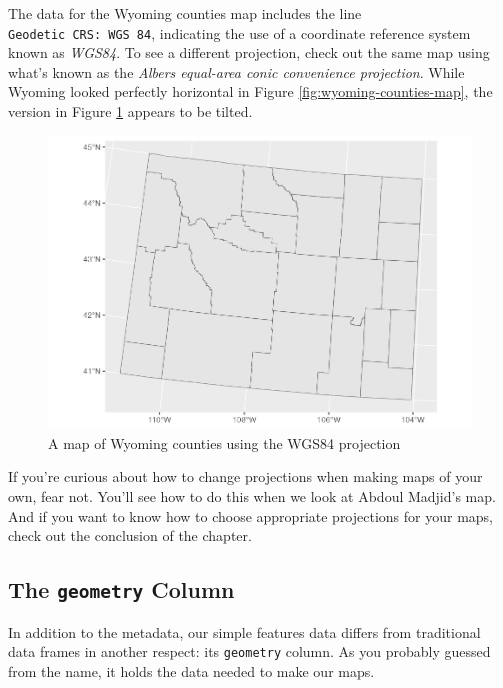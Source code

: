 \documentclass[
]{book}
\begin{document}
The data for the Wyoming counties map includes the line \texttt{Geodetic\ CRS:\ WGS\ 84}, indicating the use of a coordinate reference system known as \emph{WGS84}. To see a different projection, check out the same map using what's known as the \emph{Albers equal-area conic convenience projection}. While Wyoming looked perfectly horizontal in Figure \ref{fig:wyoming-counties-map}, the version in Figure \ref{fig:wyoming-counties-map-wgs84} appears to be tilted.

\begin{figure}
\includegraphics[width=1\linewidth]{maps_files/figure-latex/wyoming-counties-map-wgs84-1} \caption{A map of Wyoming counties using the WGS84 projection}\label{fig:wyoming-counties-map-wgs84}
\end{figure}

If you're curious about how to change projections when making maps of your own, fear not. You'll see how to do this when we look at Abdoul Madjid's map. And if you want to know how to choose appropriate projections for your maps, check out the conclusion of the chapter.

\hypertarget{the-geometry-column}{%
\subsection*{\texorpdfstring{The \texttt{geometry} Column}{The geometry Column}}\label{the-geometry-column}}

In addition to the metadata, our simple features data differs from traditional data frames in another respect: its \texttt{geometry} column. As you probably guessed from the name, it holds the data needed to make our maps.
\end{document}
